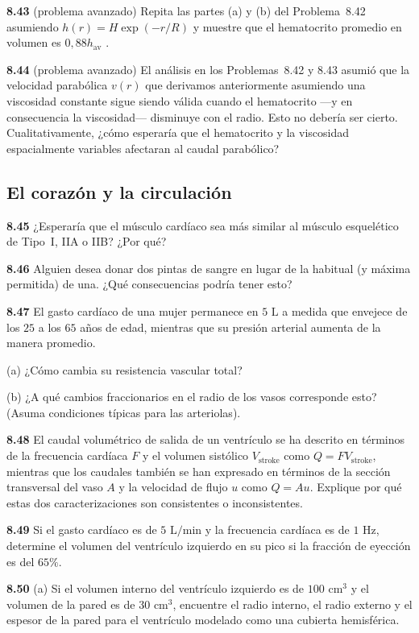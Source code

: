 \documentclass[12pt]{book}
\begin{document}
\textbf{8.43} (problema avanzado) Repita las partes (a) y (b) del Problema~8.42 asumiendo $h(r) = H \exp(-r/R)$ y muestre que el hematocrito promedio en volumen es $0{,}88 h_{\text{av}}$ \cite{51}.

\textbf{8.44} (problema avanzado) El análisis en los Problemas~8.42 y 8.43 asumió que la velocidad parabólica $v(r)$ que derivamos anteriormente asumiendo una viscosidad constante sigue siendo válida cuando el hematocrito ---y en consecuencia la viscosidad--- disminuye con el radio. Esto no debería ser cierto. Cualitativamente, ¿cómo esperaría que el hematocrito y la viscosidad espacialmente variables afectaran al caudal parabólico?

\subsection*{El corazón y la circulación}

\textbf{8.45} ¿Esperaría que el músculo cardíaco sea más similar al músculo esquelético de Tipo~I, IIA o IIB? ¿Por qué?

\textbf{8.46} Alguien desea donar dos pintas de sangre en lugar de la habitual (y máxima permitida) de una. ¿Qué consecuencias podría tener esto?

\textbf{8.47} El gasto cardíaco de una mujer permanece en $5\text{ L}$ a medida que envejece de los $25$ a los $65$ años de edad, mientras que su presión arterial aumenta de la manera promedio.

(a) ¿Cómo cambia su resistencia vascular total?

(b) ¿A qué cambios fraccionarios en el radio de los vasos corresponde esto? (Asuma condiciones típicas para las arteriolas).

\textbf{8.48} El caudal volumétrico de salida de un ventrículo se ha descrito en términos de la frecuencia cardíaca $F$ y el volumen sistólico $V_{\text{stroke}}$ como $Q = F V_{\text{stroke}}$, mientras que los caudales también se han expresado en términos de la sección transversal del vaso $A$ y la velocidad de flujo $u$ como $Q = A u$. Explique por qué estas dos caracterizaciones son consistentes o inconsistentes.

\textbf{8.49} Si el gasto cardíaco es de $5\text{ L/min}$ y la frecuencia cardíaca es de $1\text{ Hz}$, determine el volumen del ventrículo izquierdo en su pico si la fracción de eyección es del $65\%$.

\textbf{8.50} (a) Si el volumen interno del ventrículo izquierdo es de $100\text{ cm}^3$ y el volumen de la pared es de $30\text{ cm}^3$, encuentre el radio interno, el radio externo y el espesor de la pared para el ventrículo modelado como una cubierta hemisférica.
\end{document}
